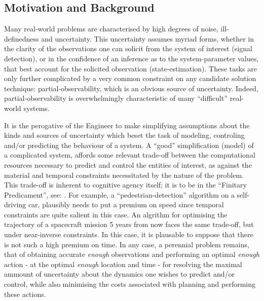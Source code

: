 \documentclass[12pt, twoside]{report}
\begin{document}
\subsection{Motivation and Background}
Many real-world problems are characterised by high degrees of noise, ill-definedness and uncertainty. This uncertainty assumes myriad forms, whether in the clarity of the observations one can solicit from the system of interest (signal detection), or in the confidence of an inference as to the system-parameter values, that best account for the solicited observation (state-estimation). These tasks are only further complicated by a very common constraint on any candidate solution technique: partial-observability, which is an obvious source of uncertainty. Indeed, partial-observability is overwhelmingly characteristic of many ``difficult'' real-world systems. 

It is the perogative of the Engineer to make simplifying assumptions about the kinds and sources of uncertainty which beset the task of modeling, controling and/or predicting the behaviour of a system. A ``good'' simplification (model) of a complicated system, affords some relevant trade-off between the computational resources necessary to predict and control the entities of interest, as against the material and temporal constraints necessitated by the nature of the problem. This trade-off is inherent to cognitive agency itself; it is to be in the ``Finitary Predicament'', see: \textcite{Cherniak}. For example, a ``pedestrian-detection'' algorithm on a self-driving car, plausibly needs to put a premium on speed since temporal constraints are quite salient in this case. An algrithm for optimising the trajectory of a spacecraft mission 5 years from now faces the same trade-off, but under near-inverse constraints. In this case, it is plausable to suppose that there is not such a high premium on time. In any case, a perennial problem remains, that of obtaining accurate \textit{enough} observations and performing an optimal \textit{enough} action - at the optimal \textit{enough} location and time - for resolving the maximal ammount of uncertainty about the dynamics one wishes to predict and/or control, while also minimising the costs associated with planning and performing these actions.  
\end{document}
